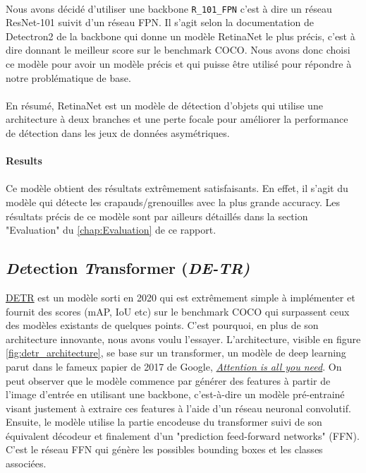 \paragraph{} Nous avons décidé d'utiliser une backbone \verb|R_101_FPN| c'est à dire un réseau ResNet-101 suivit d'un réseau FPN. Il s'agit selon la documentation de Detectron2 de la backbone qui donne un modèle RetinaNet le plus précis, c'est à dire donnant le meilleur score sur le benchmark COCO. Nous avons donc choisi ce modèle pour avoir un modèle précis et qui puisse être utilisé pour répondre à notre problématique de base.

\paragraph{} En résumé, RetinaNet est un modèle de détection d'objets qui utilise une architecture à deux branches et une perte focale pour améliorer la performance de détection dans les jeux de données asymétriques.

\paragraph{Results}

\paragraph{} Ce modèle obtient des résultats extrêmement satisfaisants. En effet, il s'agit du modèle qui détecte les crapauds/grenouilles avec la plus grande accuracy. Les résultats précis de ce modèle sont par ailleurs détaillés dans la section "Evaluation" du \autoref{chap:Evaluation} de ce rapport.

\subsection{\textit{De}tection \textit{Tr}ansformer (\textit{DE-TR)}}

\href{https://github.com/facebookresearch/detr}{DETR} est un modèle sorti en 2020 qui est extrêmement simple à implémenter et fournit des scores (mAP, IoU etc) sur le benchmark COCO qui surpassent ceux des modèles existants de quelques points. C’est pourquoi, en plus de son architecture innovante, nous avons voulu l’essayer. L’architecture, visible en figure \ref{fig:detr_architecture}, se base sur un transformer, un modèle de deep learning parut dans le fameux papier de 2017 de Google, \href{https://arxiv.org/pdf/1706.03762.pdf}{\textit{Attention is all you need}}. On peut observer que le modèle commence par générer des features à partir de l'image d'entrée en utilisant une backbone, c'est-à-dire un modèle pré-entrainé visant justement à extraire ces features à l'aide d'un réseau neuronal convolutif. Ensuite, le modèle utilise la partie encodeuse du transformer suivi de son équivalent décodeur et finalement d'un "prediction feed-forward networks" (FFN). C'est le réseau FFN qui génère les possibles bounding boxes et les classes associées.

